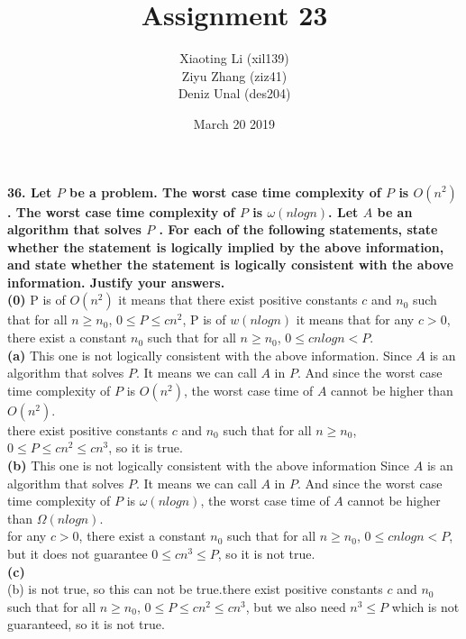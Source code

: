 \documentclass{article}
\title{Assignment 23}
\author{Xiaoting Li (xil139) \\
Ziyu Zhang (ziz41) \\
Deniz Unal (des204)}
\date{March 20 2019}
\begin{document}
\maketitle

\noindent
\textbf{36. Let $P$ be a problem. The worst case time complexity of $P$ is $O(n^2)$. The worst case time complexity of $P$ is $\omega(nlogn)$. Let $A$ be an algorithm that solves $P$ . For each of the following statements, state whether the statement is logically implied by the above information, and state whether the statement is logically consistent with the above information. Justify your answers.} \\ \newline
\textbf{(0)} P is of $O(n^2)$ it means that there exist positive constants $c$ and $n_0$ such that for all $n\geq n_0$, $0\leq P \leq c n^2$, P is of $w(nlogn)$ it means that for any $c>0$, there exist a constant $n_0$ such that for all $n\geq n_0$, $0\leq c n logn < P$. \\ \newline
\textbf{(a)} This one is not logically consistent with the above information. Since $A$ is an algorithm that solves $P$. It means we can call $A$ in $P$. And since the worst case time complexity of $P$ is $O(n^2)$, the worst case time of $A$ cannot be higher than $O(n^2)$.\\ \newline
there exist positive constants $c$ and $n_0$ such that for all $n\geq n_0$, $0\leq P \leq c n^2 \leq c n^3$, so it is true.
\\ \newline
\textbf{(b)} This one is not logically consistent with the above information Since $A$ is an algorithm that solves $P$. It means we can call $A$ in $P$. And since the worst case time complexity of $P$ is $\omega(nlogn)$, the worst case time of $A$ cannot be higher than $\Omega(nlogn)$. \\ \newline
\newline
for any $c>0$, there exist a constant $n_0$ such that for all $n\geq n_0$, $0\leq c n logn < P$, but it does not guarantee $0\leq c n^3 \leq P$, so it is not true. \\ \newline
\textbf{(c)} \\ \newline
(b) is not true, so this can not be true.there exist positive constants $c$ and $n_0$ such that for all $n\geq n_0$, $0\leq P \leq c n^2 \leq c n^3 $, but we also need $n^3 \leq P$ which is not guaranteed, so it is not true.
\\ \newline
\end{document}
